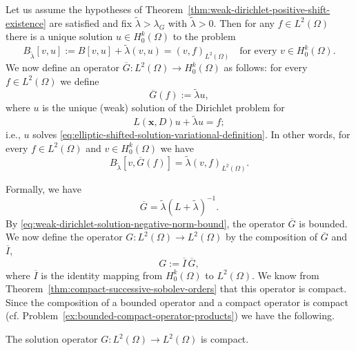 Let us assume the hypotheses of Theorem~\ref{thm:weak-dirichlet-positive-shift-existence} are satisfied and fix $\widetilde\lambda>\lambda_G$ with $\widetilde\lambda>0$. Then for any $f\in L^2(\Omega)$ there is a unique solution $u\in H_0^k(\Omega)$ to the problem
\begin{equation}\label{eq:elliptic-shifted-solution-variational-definition}
B_{\widetilde\lambda}[v,u]:=B[v,u]+\widetilde\lambda(v,u)=(v,f)_{L^2(\Omega)}\quad\text{for every }v\in H_0^k(\Omega).
\end{equation}
We now define an operator $\overline G:L^2(\Omega)\to H_0^k(\Omega)$ as follows: for every $f\in L^2(\Omega)$ we define
\begin{equation}\label{eq:elliptic-sobolev-solution-operator-definition}
\overline G(f):=\widetilde\lambda u,
\end{equation}
where $u$ is the unique (weak) solution of the Dirichlet problem for
\begin{equation}\label{eq:elliptic-solution-operator-shifted-dirichlet-equation}
L(\bm{x},D)u+\widetilde\lambda u=f;
\end{equation}
i.e., $u$ solves \eqref{eq:elliptic-shifted-solution-variational-definition}. In other words, for every $f\in L^2(\Omega)$ and $v\in H_0^k(\Omega)$ we have
\begin{equation}\label{eq:elliptic-sobolev-solution-operator-variational-identity}
B_{\widetilde\lambda}[v,\overline G(f)]=\widetilde\lambda(v,f)_{L^2(\Omega)}.
\end{equation}


Formally, we have
\begin{equation}\label{eq:elliptic-sobolev-solution-operator-formal-inverse}
\overline G=\widetilde\lambda(L+\widetilde\lambda)^{-1}.
\end{equation}
By \eqref{eq:weak-dirichlet-solution-negative-norm-bound}, the operator $\overline G$ is bounded. We now define the operator $G:L^2(\Omega)\to L^2(\Omega)$ by the composition of $\overline G$ and $\overline I$,
\begin{equation}\label{eq:elliptic-l2-compact-solution-operator-definition}
G:=\overline I\,\overline G,
\end{equation}
where $\overline I$ is the identity mapping from $H_0^k(\Omega)$ to $L^2(\Omega)$. We know from Theorem~\ref{thm:compact-successive-sobolev-orders} that this operator is compact. Since the composition of a bounded operator and a compact operator is compact (cf. Problem~\ref{ex:bounded-compact-operator-products}) we have the following.

\begin{Lemma}
\label{lem:elliptic-l2-solution-operator-compact}
The solution operator $G:L^2(\Omega)\to L^2(\Omega)$ is compact.
\end{Lemma}
